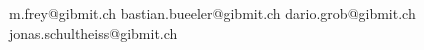 \begin{titlepage}
  \linebreak
  \linebreak
  \linebreak
  \linebreak
  \linebreak
  \linebreak
  \linebreak
  \linebreak
  \linebreak
  \linebreak
  \linebreak
  \linebreak
  \linebreak
  \linebreak
  \linebreak
  \linebreak
  \begin{multicols*}{2}
    \linebreak
    \linebreak
    m.frey@gibmit.ch
    \linebreak
    \linebreak
    \linebreak
    \linebreak
    \linebreak
    \linebreak
    \linebreak
    \linebreak
    bastian.bueeler@gibmit.ch
    \linebreak
    \linebreak
    \linebreak
    \linebreak
    \linebreak
    dario.grob@gibmit.ch
    \linebreak
    \linebreak
    \linebreak
    \linebreak
    \linebreak
    \linebreak
    \linebreak
    \linebreak
    jonas.schultheiss@gibmit.ch
  \end{multicols*}
  \afterpage{\blankpage}
  \end{titlepage}
